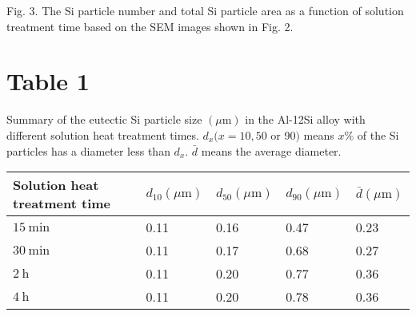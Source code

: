 \documentclass[10pt]{article}
\begin{document}
Fig. 3. The Si particle number and total Si particle area as a function of solution treatment time based on the SEM images shown in Fig. 2.

\section*{Table 1}
Summary of the eutectic Si particle size $(\mu \mathrm{m})$ in the Al-12Si alloy with different solution heat treatment times. $d_{x}(x=10,50$ or 90$)$ means $x \%$ of the Si particles has a diameter less than $d_{x}$. $\bar{d}$ means the average diameter.

\begin{center}
\begin{tabular}{lllll}
\hline
Solution heat treatment time & $d_{10}(\mu \mathrm{m})$ & $d_{50}(\mu \mathrm{m})$ & $d_{90}(\mu \mathrm{m})$ & $\bar{d}(\mu \mathrm{m})$ \\
\hline
$15 \mathrm{~min}$ & 0.11 & 0.16 & 0.47 & 0.23 \\
$30 \mathrm{~min}$ & 0.11 & 0.17 & 0.68 & 0.27 \\
$2 \mathrm{~h}$ & 0.11 & 0.20 & 0.77 & 0.36 \\
$4 \mathrm{~h}$ & 0.11 & 0.20 & 0.78 & 0.36 \\
\hline
\end{tabular}
\end{center}
\end{document}
